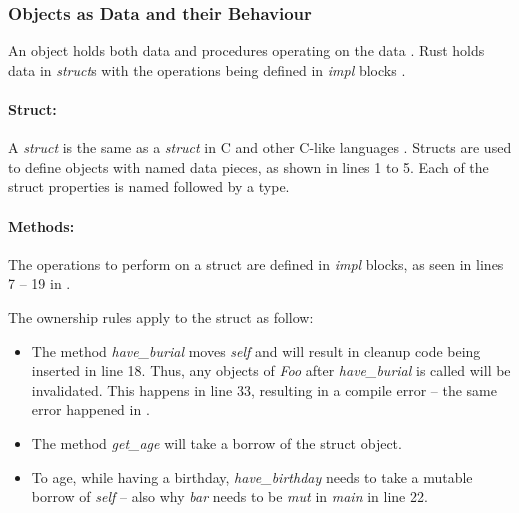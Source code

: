\subsubsection{Objects as Data and their Behaviour}
An object holds both data and procedures operating on the data \cite{meyer_97_01,stefik_85_01,gamma_94_01,malik_09_01}.
Rust holds data in \textit{struct}s with the operations being defined in \textit{impl} blocks \cite{klabnik_2019_01}.

\paragraph{Struct:}
A \textit{struct} is the same as a \textit{struct} in C \cite{stroustrup_13_01} and other C-like languages \cite{robinson_04_01,savitch_15_01,malik_09_01}.
Structs are used to define objects with named data pieces, as shown in  lines 1 to 5.
Each of the struct properties is named followed by a type.

\paragraph{Methods:}
The operations to perform on a struct are defined in \textit{impl} blocks, as seen in lines 7 -- 19 in .

The ownership rules apply to the struct as follow:
\begin{itemize}
	\item The method \textit{have\_burial} moves \textit{self} and will result in cleanup code being inserted in line 18.
	      Thus, any objects of \textit{Foo} after \textit{have\_burial} is called will be invalidated.
	      This happens in line 33, resulting in a compile error -- the same error happened in .
	\item The method \textit{get\_age} will take a borrow of the struct object.
	\item To age, while having a birthday, \textit{have\_birthday} needs to take a mutable borrow of \textit{self} -- also why \textit{bar} needs to be \textit{mut} in \textit{main} in line 22.
\end{itemize}


\addtocounter{footnote}{1}
\addtocounter{footnote}{1}
\addtocounter{footnote}{1}

